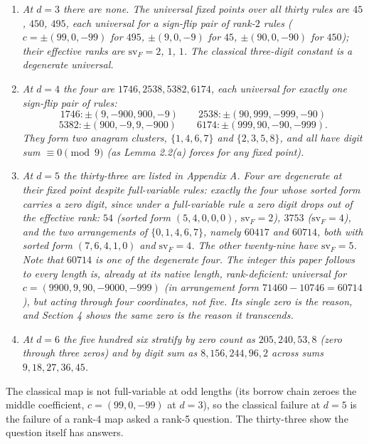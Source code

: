 \documentclass[11pt,letterpaper]{article}
\providecommand{\tightlist}{%
  \setlength{\itemsep}{0pt}\setlength{\parskip}{0pt}}
\theoremstyle{paperstyle}
\theoremstyle{paperstyledef}
\theoremstyle{paperstylerem}
\begin{document}
\begin{enumerate}
\def\labelenumi{\arabic{enumi}.}
\tightlist
\item
  \emph{At \(d = 3\) there are none. The universal fixed points over all thirty rules are \(45\), \(450\), \(495\), each universal for a sign-flip pair of rank-\(2\) rules (\(c = \pm(99, 0, -99)\) for \(495\), \(\pm(9,0,-9)\) for \(45\), \(\pm(90,0,-90)\) for \(450\)); their effective ranks are \(\mathrm{sv}_F = 2\), \(1\), \(1\). The classical three-digit constant is a degenerate universal.}
\item
  \emph{At \(d = 4\) the four are \(1746, 2538, 5382, 6174\), each universal for exactly one sign-flip pair of rules:} \[1746: \pm(9, -900, 900, -9) \qquad 2538: \pm(90, 999, -999, -90)\] \[5382: \pm(900, -9, 9, -900) \qquad 6174: \pm(999, 90, -90, -999).\] \emph{They form two anagram clusters, \(\{1,4,6,7\}\) and \(\{2,3,5,8\}\), and all have digit sum \(\equiv 0 \pmod 9\) (as Lemma 2.2(a) forces for any fixed point).}
\item
  \emph{At \(d = 5\) the thirty-three are listed in Appendix A. Four are degenerate at their fixed point despite full-variable rules: exactly the four whose sorted form carries a zero digit, since under a full-variable rule a zero digit drops out of the effective rank: \(54\) (sorted form \((5,4,0,0,0)\), \(\mathrm{sv}_F = 2\)), \(3753\) (\(\mathrm{sv}_F = 4\)), and the two arrangements of \(\{0,1,4,6,7\}\), namely \(60417\) and \(60714\), both with sorted form \((7,6,4,1,0)\) and \(\mathrm{sv}_F = 4\). The other twenty-nine have \(\mathrm{sv}_F = 5\). Note that \(60714\) is one of the degenerate four. The integer this paper follows to every length is, already at its native length, rank-deficient: universal for \(c = (9900, 9, 90, -9000, -999)\) (in arrangement form \(71460 - 10746 = 60714\)), but acting through four coordinates, not five. Its single zero is the reason, and Section 4 shows the same zero is the reason it transcends.}
\item
  \emph{At \(d = 6\) the five hundred six stratify by zero count as \(205, 240, 53, 8\) (zero through three zeros) and by digit sum as \(8, 156, 244, 96, 2\) across sums \(9, 18, 27, 36, 45\).}
\end{enumerate}

The classical map is not full-variable at odd lengths (its borrow chain zeroes the middle coefficient, \(c = (99, 0, -99)\) at \(d=3\)), so the classical failure at \(d = 5\) is the failure of a rank-4 map asked a rank-5 question. The thirty-three show the question itself has answers.
\end{document}
